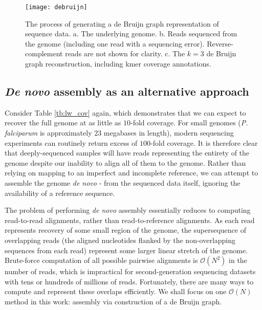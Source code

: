 \begin{figure}[b]
  \centering
    \texttt{[image: debruijn]}
  \caption{The process of generating a de Bruijn graph representation of sequence data.  a. The underlying genome. b. Reads sequenced from the genome (including one read with a sequencing error).  Reverse-complement reads are not shown for clarity.  c. The $k=3$ de Bruijn graph reconstruction, including kmer coverage annotations.}
  \label{fig:debruijn}
\end{figure}

\subsection{\textit{De novo} assembly as an alternative approach}

Consider Table \ref{tb:lw_cov} again, which demonstrates that we can expect to recover the full genome at as little as $10$-fold coverage.  For small genomes (\textit{P. falciparum} is approximately $23$ megabases in length), modern sequencing experiments can routinely return excess of $100$-fold coverage.  It is therefore clear that deeply-sequenced samples will have reads representing the entirety of the genome despite our inability to align all of them to the genome.  Rather than relying on mapping to an imperfect and incomplete reference, we can attempt to assemble the genome \textit{de novo} - from the sequenced data itself, ignoring the availability of a reference sequence.

The problem of performing \textit{de novo} assembly essentially reduces to computing read-to-read alignments, rather than read-to-reference alignments.  As each read represents recovery of some small region of the genome, the supersequence of overlapping reads (the aligned nucleotides flanked by the non-overlapping sequences from each read) represent some larger linear stretch of the genome.  Brute-force computation of all possible pairwise alignments is $\mathcal{O}(N^2)$ in the number of reads, which is impractical for second-generation sequencing datasets with tens or hundreds of millions of reads.  Fortunately, there are many ways to compute and represent these overlaps efficiently.  We shall focus on one $\mathcal{O}(N)$ method in this work: assembly via construction of a de Bruijn graph.

